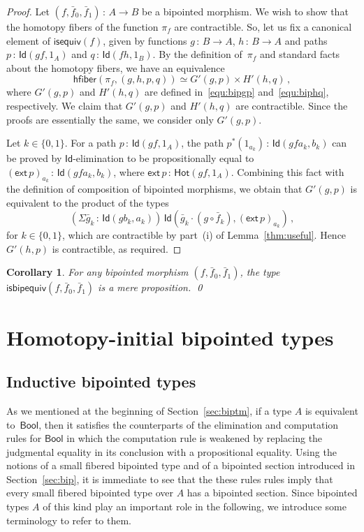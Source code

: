 \documentclass[10pt,a4paper,oneside,reqno]{amsart}
\numberwithin{equation}{section}
\theoremstyle{mythm}
\newtheorem{corollary}[theorem]{Corollary}
\theoremstyle{mydef}
\theoremstyle{myrmk}
\newcommand{\co}{\,{:}\,}
\newcommand{\ct}{\cdot}
\newcommand{\hfiber}{\mathsf{hfiber}}
\newcommand{\isequiv}{\mathsf{isequiv}}
\newcommand{\Hot}{\mathsf{Hot}}
\newcommand{\ext}{\mathsf{ext}}
\newcommand{\Bool}{\mathsf{Bool}}
\newcommand{\Id}{\mathsf{Id}}
\newcommand{\isbipequiv}{\mathsf{isbipequiv}}
\begin{document}
\begin{proof}
Let  $(f, \bar{f}_0, \bar{f}_1) \co A \to B$ be a bipointed morphism. We wish to show that the homotopy fibers
of the function $\pi_f$ are contractible. So, let us fix a canonical element of $\isequiv(f)$, given by functions $g \co B
\to A$, $h \co B \to A$ and paths $p \co \Id(gf, 1_A)$ and $q \co \Id(fh, 1_B)$. By the definition of~$\pi_f$ and standard
facts about the homotopy fibers, we have an equivalence 
\[
\hfiber(\pi_f, (g,h, p, q)) \simeq G'(g,p) \times H'(h,q) \, ,
\]
 where $G'(g,p)$ and $H'(h,q)$ are defined
in~\eqref{equ:bipgp} and~\eqref{equ:biphq}, respectively. 
We claim that $G'(g,p)$ and $H'(h,q)$ are contractible. Since
the proofs are essentially the same, we consider only $G'(g,p)$.  

Let $k \in \{0, 1 \}$. For a path $p \co \Id(gf, 1_A)$, the path $p^*(1_{a_k}) \co \Id( gf a_k, b_k)$ can be proved by $\Id$-elimination to be propositionally equal to $(\ext \, p)_{a_k}\co \Id(gfa_k, b_k)$, where $\ext \, p \co \Hot(gf, 1_A)$. Combining this fact with the definition of composition of bipointed morphisms, we obtain that
$G'(g,p)$ is equivalent to the product of the types
\[
(\Sigma \bar{g}_k \co \Id( gb_k, a_k)) \, \Id ( \bar{g}_k \ct (g \circ \bar{f}_k), (\ext \, p)_{a_k}) \, ,
\]
for $k \in \{0, 1 \}$, which are contractible by part~(i) of Lemma~\ref{thm:useful}. Hence $G'(h,p)$ is contractible, as required.
\end{proof}


\begin{corollary} For any bipointed morphism $(f, \bar{f}_0, \bar{f}_1)$, the type $\isbipequiv(f, \bar{f}_0, \bar{f}_1)$ is a mere proposition. \qed
\end{corollary} 





\section{Homotopy-initial bipointed types} 
\label{sec:homibt}


\subsection*{Inductive bipointed types} 
As we mentioned at the beginning of Section~\ref{sec:biptm}, if a type $A$ is equivalent to~$\Bool$, then 
it satisfies the counterparts of the elimination and computation rules for $\Bool$ in which the computation rule is 
weakened by replacing the judgmental equality in its conclusion with a propositional equality. Using the notions of a small fibered bipointed type and of a bipointed section introduced in Section~\ref{sec:bip}, it is immediate to see that the these rules rules imply that every small  fibered  bipointed type over $A$ has a bipointed section. 
Since bipointed types $A$ of this kind  play an important role in the following, we introduce some terminology to refer to them.
\end{document}
